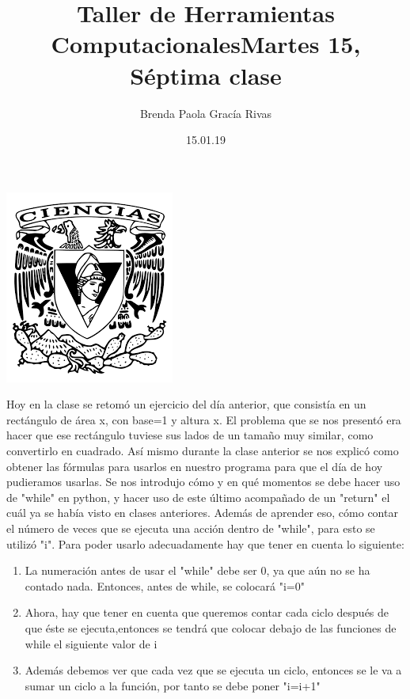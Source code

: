 \documentclass[letterpaper, 12pt, oneside]{article}
\title{\huge \color{green}Taller de Herramientas Computacionales}
\author{Brenda Paola Gracía Rivas}
\date{15.01.19}
\begin{document}
	\maketitle
	\begin{center}
		\includegraphics[scale=1.0]{1.png}
	\end{center}
	\newpage
	\title{Martes 15, Séptima clase\\}
	Hoy en la clase se retomó un ejercicio del día anterior, que consistía en un rectángulo de área x, con base=1 y altura x. El problema que se nos presentó era hacer que ese rectángulo tuviese sus lados de un tamaño muy similar, como convertirlo en cuadrado.
	Así mismo durante la clase anterior se nos explicó como obtener las fórmulas para usarlos en nuestro programa para que el día de hoy pudieramos usarlas. Se nos introdujo cómo y en qué momentos se debe hacer uso de "while" en python, y hacer uso de este último acompañado de un "return" el cuál ya se había visto en clases anteriores.
	Además de aprender eso, cómo contar el número de veces que se ejecuta una acción dentro de "while", para esto se utilizó "i". Para poder usarlo adecuadamente hay que tener en cuenta lo siguiente:
	\begin{enumerate}
		\item 
		La numeración antes de usar el "while" debe ser 0, ya que aún no se ha contado nada. Entonces, antes de while, se colocará "i=0"
		\item 
		Ahora, hay que tener en cuenta que queremos contar cada ciclo después de que éste se ejecuta,entonces se tendrá que colocar debajo de las funciones de while el siguiente valor de i
		\item 
		Además debemos ver que cada vez que se ejecuta un ciclo, entonces se le va a sumar un ciclo a la función, por tanto se debe poner "i=i+1"
	\end{enumerate}
	
\end{document}
